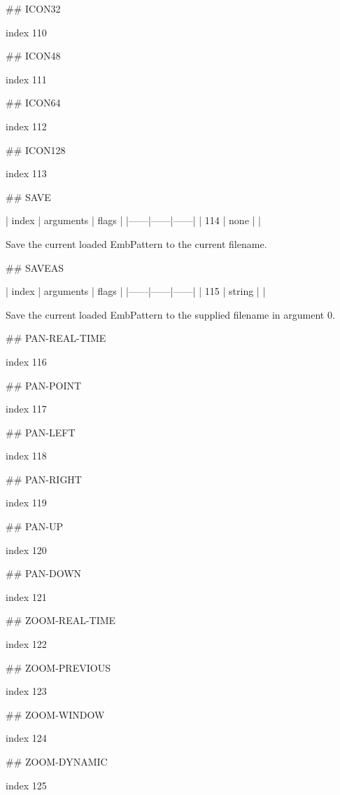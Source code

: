 ## ICON32

index 110



## ICON48

index 111



## ICON64

index 112



## ICON128

index 113



## SAVE

| index | arguments | flags |
|------|------|------|
| 114 | none | |

Save the current loaded EmbPattern to the current filename.

## SAVEAS

| index | arguments | flags |
|------|------|------|
| 115 | string | |

Save the current loaded EmbPattern to the supplied filename in argument 0.

## PAN-REAL-TIME

index 116



## PAN-POINT

index 117



## PAN-LEFT

index 118



## PAN-RIGHT

index 119



## PAN-UP

index 120



## PAN-DOWN

index 121



## ZOOM-REAL-TIME

index 122



## ZOOM-PREVIOUS

index 123



## ZOOM-WINDOW

index 124



## ZOOM-DYNAMIC

index 125



